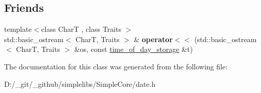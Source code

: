 \subsection*{Friends}
\begin{DoxyCompactItemize}
\item 
\mbox{\label{classdate_1_1detail_1_1time__of__day__storage_3_01std_1_1chrono_1_1duration_3_01_rep_00_01_perio2f7e02f06472a83980e1d0196ea2746d_aa723ed987ab639045a035ce6020dfb3d}} 
{\footnotesize template$<$class CharT , class Traits $>$ }\\std\+::basic\+\_\+ostream$<$ CharT, Traits $>$ \& {\bfseries operator$<$$<$} (std\+::basic\+\_\+ostream$<$ CharT, Traits $>$ \&os, const \mbox{\hyperlink{classdate_1_1detail_1_1time__of__day__storage}{time\+\_\+of\+\_\+day\+\_\+storage}} \&t)
\end{DoxyCompactItemize}


The documentation for this class was generated from the following file\+:\begin{DoxyCompactItemize}
\item 
D\+:/\+\_\+git/\+\_\+github/simplelibs/\+Simple\+Core/date.\+h\end{DoxyCompactItemize}
